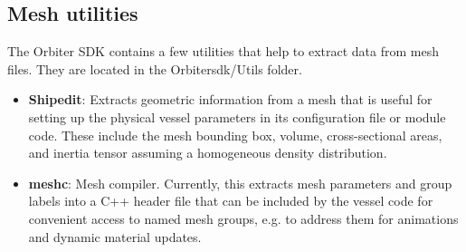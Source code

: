 \documentclass[Orbiter Developer Manual.tex]{subfiles}
\begin{document}
\subsection{Mesh utilities}
The Orbiter SDK contains a few utilities that help to extract data from mesh files. They are located in the Orbitersdk/Utils folder.

\begin{itemize}
\item \textbf{Shipedit}: Extracts geometric information from a mesh that is useful for setting up the physical vessel parameters in its configuration file or module code. These include the mesh bounding box, volume, cross-sectional areas, and inertia tensor assuming a homogeneous density distribution.
\item \textbf{meshc}: Mesh compiler. Currently, this extracts mesh parameters and group labels into a C++ header file that can be included by the vessel code for convenient access to named mesh groups, e.g. to address them for animations and dynamic material updates.
\end{itemize}
\end{document}
